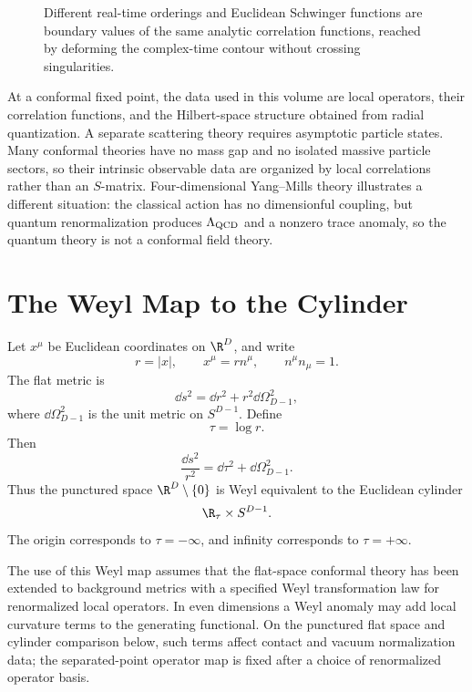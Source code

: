 \begin{figure}[H]
{
  }
  \caption{Different real-time orderings and Euclidean Schwinger functions are
  boundary values of the same analytic correlation functions, reached by
  deforming the complex-time contour without crossing singularities.}
  \label{fig:cft-wightman-time-euclidean-contours}
\end{figure}

\begin{remark}
At a conformal fixed point, the data used in this volume are local operators,
their correlation functions, and the Hilbert-space structure obtained from
radial quantization.  A separate scattering theory requires asymptotic
particle states.  Many conformal theories have no mass gap and no isolated
massive particle sectors, so their intrinsic observable data are organized by
local correlations rather than an \(S\)-matrix.  Four-dimensional Yang--Mills
theory illustrates a different situation: the classical action has no
dimensionful coupling, but quantum renormalization produces
\(\Lambda_{\rm QCD}\) and a nonzero trace anomaly, so the quantum theory is
not a conformal field theory.
\end{remark}

\section{The Weyl Map to the Cylinder}

Let \(x^\mu\) be Euclidean coordinates on \(\R^D\), and write
\[
  r=|x|,\qquad
  x^\mu=r n^\mu,\qquad
  n^\mu n_\mu=1.
\]
The flat metric is
\[
  \dd s^2
  =
  \dd r^2+r^2\dd\Omega_{D-1}^2,
\]
where \(\dd\Omega_{D-1}^2\) is the unit metric on \(S^{D-1}\).  Define
\[
  \tau=\log r .
\]
Then
\begin{equation}
  \frac{\dd s^2}{r^2}
  =
  \dd\tau^2+\dd\Omega_{D-1}^2.
  \label{eq:radial-cylinder-metric}
\end{equation}
Thus the punctured space \(\R^D\setminus\{0\}\) is Weyl equivalent to the
Euclidean cylinder
\[
  \R_\tau\times S^{D-1}.
\]
The origin corresponds to \(\tau=-\infty\), and infinity corresponds to
\(\tau=+\infty\).

The use of this Weyl map assumes that the flat-space conformal theory has
been extended to background metrics with a specified Weyl transformation law
for renormalized local operators.  In even dimensions a Weyl anomaly may add
local curvature terms to the generating functional.  On the punctured flat
space and cylinder comparison below, such terms affect contact and vacuum
normalization data; the separated-point operator map is fixed after a choice
of renormalized operator basis.

